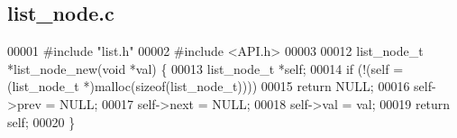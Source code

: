 \subsection{list\+\_\+node.\+c}
\label{list__node_8c_source}

\begin{DoxyCode}
00001 \textcolor{preprocessor}{#include "list.h"}
00002 \textcolor{preprocessor}{#include <API.h>}
00003 
00012 list_node_t *list_node_new(\textcolor{keywordtype}{void} *val) \{
00013   list_node_t *\textcolor{keyword}{self};
00014   \textcolor{keywordflow}{if} (!(\textcolor{keyword}{self} = (list_node_t *)malloc(\textcolor{keyword}{sizeof}(list_node_t))))
00015     \textcolor{keywordflow}{return} NULL;
00016   \textcolor{keyword}{self}->prev = NULL;
00017   \textcolor{keyword}{self}->next = NULL;
00018   \textcolor{keyword}{self}->val = val;
00019   \textcolor{keywordflow}{return} \textcolor{keyword}{self};
00020 \}
\end{DoxyCode}
